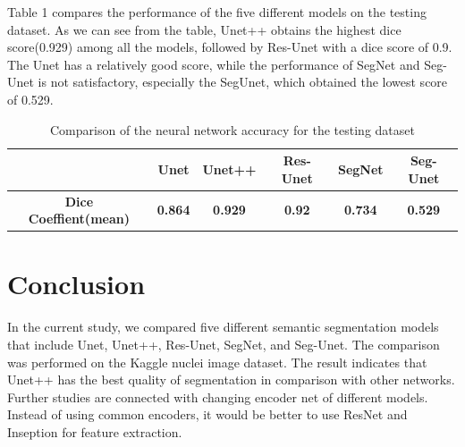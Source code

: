\documentclass{article}
\begin{document}
Table 1 compares the performance of the five different models on the testing dataset. As we can see from the table, Unet++ obtains the highest dice score(0.929) among all the models, followed by Res-Unet with a dice score of 0.9. The Unet has a relatively good score, while the performance of SegNet and Seg-Unet is not satisfactory, especially the SegUnet, which obtained the lowest score of 0.529.
\begin{table}[H]
    \begin{tabular}{@{}cccccc@{}}
        \toprule
        \textbf{}                     & \textbf{Unet}  & \textbf{Unet++} & \textbf{Res-Unet} & \textbf{SegNet} & \textbf{Seg-Unet} \\ \midrule
        \textbf{Dice Coeffient(mean)} & \textbf{0.864} & \textbf{0.929}  & \textbf{0.92}     & \textbf{0.734}  & \textbf{0.529}    \\ \bottomrule
    \end{tabular}
    \caption{Comparison of the neural network accuracy for the testing dataset}
\end{table}

\section{Conclusion}
In the current study, we compared five different semantic segmentation models that include Unet, Unet++, Res-Unet, SegNet, and Seg-Unet. The comparison was performed on the Kaggle nuclei image dataset. The result indicates that Unet++ has the best quality of segmentation in comparison with other networks. Further studies are connected with changing encoder net of different models. Instead of using common encoders, it would be better to use ResNet and Inseption for feature extraction.



\end{document}
